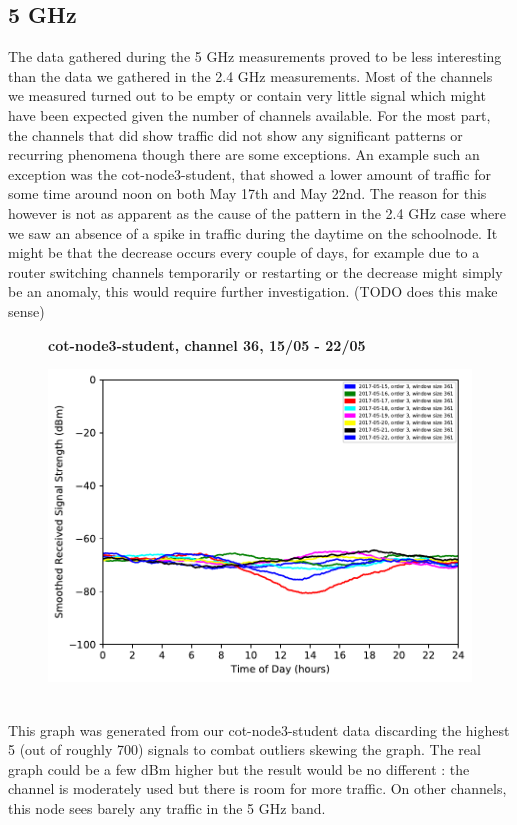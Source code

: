 \subsection{5 GHz}
The data gathered during the 5 GHz measurements proved to be less interesting than the data we gathered in the 2.4 GHz measurements. Most of the channels we measured turned out to be empty or contain very little signal which might have been expected given the number of channels available. For the most part, the channels that did show traffic did not show any significant patterns or recurring phenomena though there are some exceptions. An example such an exception was the cot-node3-student, that showed a lower amount of traffic for some time around noon on both May 17th and May 22nd. The reason for this however is not as apparent as the cause of the pattern in the 2.4 GHz case where we saw an absence of a spike in traffic during the daytime on the schoolnode. It might be that the decrease occurs every couple of days, for example due to a router switching channels temporarily or restarting or the decrease might simply be an anomaly, this would require further investigation. (TODO does this make sense)
\begin{figure}[h!]
    \centering
    \textbf{cot-node3-student, channel 36, 15/05 - 22/05}\par\medskip
	\includegraphics[scale=0.5]{images/5_GHz/cot-node3-student_2017-05-22_chan36_image.pdf}
\end{figure}\\
This graph was generated from our cot-node3-student data discarding the highest 5 (out of roughly 700) signals to combat outliers skewing the graph. The real graph could be a few dBm higher but the result would be no different : the channel is moderately used but there is room for more traffic. On other channels, this node sees barely any traffic in the 5 GHz band. \\
